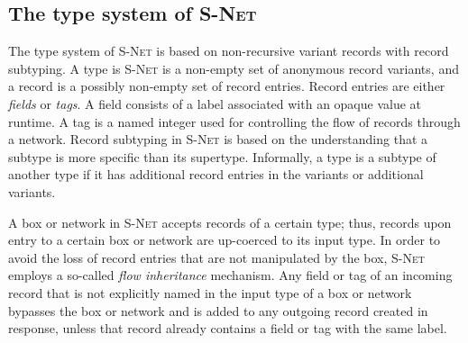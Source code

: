    \subsection*{The type system of \textsc{S-Net}}
The type system of \textsc{S-Net} is based on non-recursive variant records with record subtyping. A type is \textsc{S-Net} is a non-empty set of anonymous record variants, and a record is a possibly non-empty set of record entries. Record entries are either \emph{fields} or \emph{tags}. A field consists of a label associated with an opaque value at runtime. A tag is a named integer used for controlling the flow of records through a network. Record subtyping in \textsc{S-Net} is based on the understanding that a subtype is more specific than its supertype. Informally, a type is a subtype of another type if it has additional record entries in the variants or additional variants.

A box or network in \textsc{S-Net} accepts records of a certain type; thus, records upon entry to a certain box or network are up-coerced to its input type. In order to avoid the loss of record entries that are not manipulated by the box, \textsc{S-Net} employs a so-called \emph{flow inheritance} mechanism. Any field or tag of an incoming record that is not explicitly named in the input type of a box or network bypasses the box or network and is added to any outgoing record created in response, unless that record already contains a field or tag with the same label.


